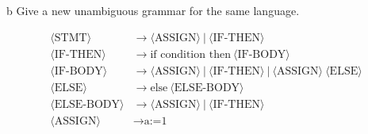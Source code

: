 \documentclass[11pt]{article}
\newcommand{\token}[1]{\langle \text{#1} \rangle}
\begin{document}
\newpage 

\begin{problem}[Part]{b}
Give a new unambiguous grammar for the same language.
\end{problem}
\begin{align*}
\token{STMT} &\rightarrow \token{ASSIGN} \ | \ \token{IF-THEN} \\
\token{IF-THEN} &\rightarrow \text{if condition then} \ \token{IF-BODY} \\
\token{IF-BODY} &\rightarrow \token{ASSIGN} \ | \ \token{IF-THEN} \ | \ \token{ASSIGN} \ \token{ELSE} \\
\token{ELSE} &\rightarrow \text{else} \ \token{ELSE-BODY} \\
\token{ELSE-BODY} &\rightarrow \token{ASSIGN} \ | \ \token{IF-THEN} \\
\token{ASSIGN} &\rightarrow \text{a:=1} \\
\end{align*}
\end{document}
